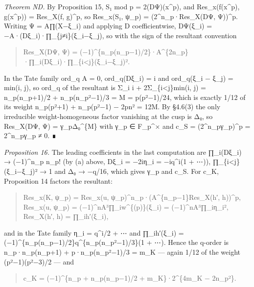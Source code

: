 \documentclass[11pt,a4paper]{article}
\theoremstyle{named}
\begin{document}
\textit{Theorem ND.} By Proposition 15, S₁ mod p = 2(DΨ)(x\textasciicircum{}p), and Res\_x(f(x\textasciicircum{}p), g(x\textasciicircum{}p)) = Res\_X(f, g)\textasciicircum{}p, so Res\_x(S₁, ψ\_p) = (2\textasciicircum{}n\_p·Res\_X(DΨ, Ψ))\textasciicircum{}p. Writing Ψ = A∏(X−ξ\_i) and applying D coefficientwise, DΨ(ξ\_i) = −A·(Dξ\_i)·∏\_\{j≠i\}(ξ\_i−ξ\_j), so with the sign of the resultant convention

\begin{quote}
Res\_X(DΨ, Ψ) = (−1)\textasciicircum{}\{n\_p(n\_p−1)/2\}·A\textasciicircum{}\{2n\_p\}·∏\_i(Dξ\_i)·∏\_\{i\textless{}j\}(ξ\_i−ξ\_j)².
\end{quote}

In the Tate family ord\_q A = 0, ord\_q(Dξ\_i) = i and ord\_q(ξ\_i − ξ\_j) = min(i, j), so ord\_q of the resultant is Σ\_i i + 2Σ\_\{i\textless{}j\}min(i, j) = n\_p(n\_p+1)/2 + n\_p(n\_p²−1)/3 = M = p(p²−1)/24, which is exactly 1/12 of its weight n\_p(p²+1) + n\_p(p²−1) − 2pn² = 12M. By §4.6(3) the only irreducible weight-homogeneous factor vanishing at the cusp is Δ₀, so Res\_X(DΨ, Ψ) = γ\_pΔ₀\textasciicircum{}\{M\} with γ\_p ∈ F\_p\textasciicircum{}× and c\_S = (2\textasciicircum{}n\_pγ\_p)\textasciicircum{}p = 2\textasciicircum{}n\_pγ\_p ≠ 0. ∎

\textit{Proposition 16.} The leading coefficients in the last computation are ∏\_i(Dξ\_i) → (−1)\textasciicircum{}n\_p n\_p! (by (a) above, Dξ\_i = −2iη\_i = −iq\textasciicircum{}i(1 + ⋯)), ∏\_\{i\textless{}j\}(ξ\_i−ξ\_j)² → 1 and Δ₀ → −q/16, which gives γ\_p and c\_S. For c\_K, Proposition 14 factors the resultant:

\begin{quote}
Res\_x(K, ψ\_p) = Res\_x(u, ψ\_p)\textasciicircum{}n\_p·(A\textasciicircum{}\{n\_p−1\}Res\_X(h′, h))\textasciicircum{}p,  Res\_x(u, ψ\_p) = (−1)\textasciicircum{}nA³∏\_iw\textasciicircum{}\{(p)\}(ξ\_i) = (−1)\textasciicircum{}nA³∏\_iη\_i²,  Res\_X(h′, h) = ∏\_ih′(ξ\_i),
\end{quote}

and in the Tate family η\_i = q\textasciicircum{}i/2 + ⋯ and ∏\_ih′(ξ\_i) = (−1)\textasciicircum{}\{n\_p(n\_p−1)/2\}q\textasciicircum{}\{n\_p(n\_p²−1)/3\}(1 + ⋯). Hence the q-order is n\_p·n\_p(n\_p+1) + p·n\_p(n\_p²−1)/3 = m\_K — again 1/12 of the weight (p²−1)(p²−3)/2 — and

\begin{quote}
c\_K = (−1)\textasciicircum{}\{n\_p + n\_p(n\_p−1)/2 + m\_K\}·2\textasciicircum{}\{4m\_K − 2n\_p²\}.
\end{quote}
\end{document}
